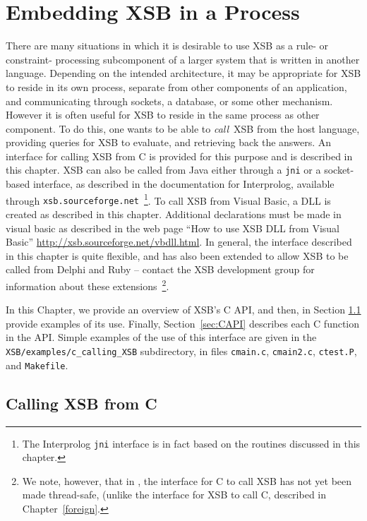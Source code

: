 \chapter{Embedding XSB in a Process}
\label{ccallingxsb}

There are many situations in which it is desirable to use XSB as a
rule- or constraint- processing subcomponent of a larger system that
is written in another language.  Depending on the intended
architecture, it may be appropriate for XSB to reside in its own
process, separate from other components of an application, and
communicating through sockets, a database, or some other mechanism.
However it is often useful for XSB to reside in the same process as
other component.  To do this, one wants to be able to {\em call}\ XSB
from the host language, providing queries for XSB to evaluate, and
retrieving back the answers.  An interface for calling XSB from C is
provided for this purpose and is described in this chapter.  XSB can
also be called from Java either through a {\tt jni} or a socket-based
interface, as described in the documentation for Interprolog,
available through {\tt xsb.sourceforge.net}~\footnote{The Interprolog
  {\tt jni} interface is in fact based on the routines discussed in
  this chapter.}.  To call XSB from Visual Basic, a DLL is created as
described in this chapter.  Additional declarations must be made in
visual basic as described in the web page ``How to use XSB DLL from
Visual Basic'' \url{http://xsb.sourceforge.net/vbdll.html}.  In
general, the interface described in this chapter is quite flexible,
and has also been extended to allow XSB to be called from Delphi and
Ruby -- contact the XSB development group for information about these
extensions~\footnote{We note, however, that in \version{}, the
  interface for C to call XSB has not yet been made thread-safe,
  (unlike the interface for XSB to call C, described in
  Chapter~\ref{foreign}.}.

In this Chapter, we provide an overview of XSB's C API, and then, in
Section \ref{} provide examples of its use.  Finally,
Section~\ref{sec:CAPI} describes each C function in the API.
%
Simple examples of the use of this interface are given in the {\tt
  XSB/examples/c\_calling\_XSB} subdirectory, in files {\tt cmain.c},
{\tt cmain2.c}, {\tt ctest.P}, and {\tt Makefile}.

\section{Calling XSB from C}

